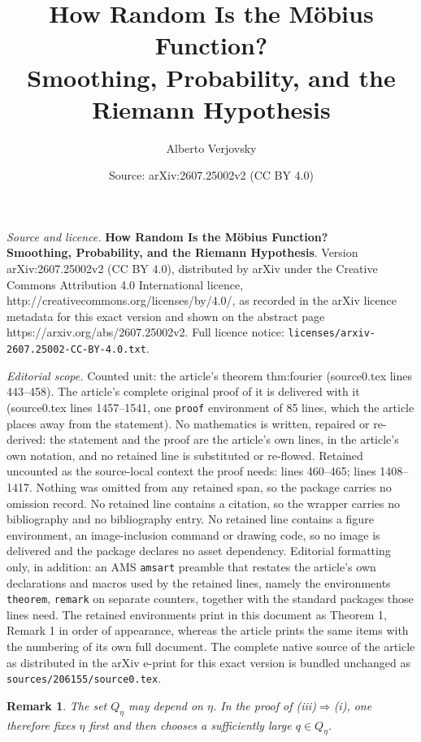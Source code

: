 \documentclass[10pt,a4paper]{amsart}
\title{\textbf{How Random Is the M\"obius Function?\\ Smoothing, Probability, and the Riemann Hypothesis}}
\author{Alberto Verjovsky}
\date{Source: arXiv:2607.25002v2 (CC BY 4.0)}
\newtheorem{remark}{Remark}
\begin{document}
\maketitle

\noindent\emph{Source and licence.} \textbf{How Random Is the M\"obius Function?\\ Smoothing, Probability, and the Riemann Hypothesis}. Version arXiv:2607.25002v2 (CC BY 4.0), distributed by arXiv under the Creative Commons Attribution 4.0 International licence, http://creativecommons.org/licenses/by/4.0/, as recorded in the arXiv licence metadata for this exact version and shown on the abstract page https://arxiv.org/abs/2607.25002v2. Full licence notice: \texttt{licenses/arxiv-2607.25002-CC-BY-4.0.txt}.\par\smallskip

\noindent\textit{Editorial scope.} Counted unit: the article's theorem thm:fourier (source0.tex lines 443--458). The article's complete original proof of it is delivered with it (source0.tex lines 1457--1541, one \texttt{proof} environment of 85 lines, which the article places away from the statement). No mathematics is written, repaired or re-derived: the statement and the proof are the article's own lines, in the article's own notation, and no retained line is substituted or re-flowed.  Retained uncounted as the source-local context the proof needs: lines 460--465; lines 1408--1417.  Nothing was omitted from any retained span, so the package carries no omission record.  No retained line contains a citation, so the wrapper carries no bibliography and no bibliography entry.  No retained line contains a figure environment, an image-inclusion command or drawing code, so no image is delivered and the package declares no asset dependency.  Editorial formatting only, in addition: an AMS \texttt{amsart} preamble that restates the article's own declarations and macros used by the retained lines, namely the environments \texttt{theorem}, \texttt{remark} on separate counters, together with the standard packages those lines need.  The retained environments print in this document as Theorem 1, Remark 1 in order of appearance, whereas the article prints the same items with the numbering of its own full document.  The complete native source of the article as distributed in the arXiv e-print for this exact version is bundled unchanged as \texttt{sources/206155/source0.tex}.
\begin{remark}\label{rem:iii-precise}
The set \(Q_\eta\) may depend on \(\eta\).  In the proof of
\textup{(iii)}\(\Rightarrow\)\textup{(i)}, one therefore fixes
\(\eta\) first and then chooses a sufficiently large
\(q\in Q_\eta\).
\end{remark}
\end{document}
